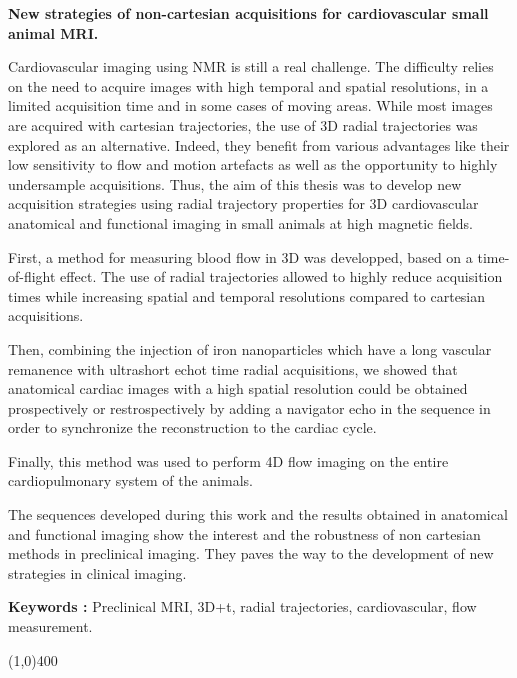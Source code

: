 \noindent
\small{\textbf{New strategies of non-cartesian acquisitions for cardiovascular small animal MRI.}

Cardiovascular imaging using NMR is still a real challenge. The difficulty relies on the need to acquire images with high temporal and spatial resolutions, in a limited acquisition time and in some cases of moving areas. While most images are acquired with cartesian trajectories, the use of 3D radial trajectories was explored as an alternative. Indeed, they benefit from various advantages like their low sensitivity to flow and motion artefacts as well as the opportunity to highly undersample acquisitions. Thus, the aim of this thesis was to develop new acquisition strategies using radial trajectory properties for 3D cardiovascular anatomical and functional imaging in small animals at high magnetic fields.

First, a method for measuring blood flow in 3D was developped, based on a time-of-flight effect. The use of radial trajectories allowed to highly reduce acquisition times while increasing spatial and temporal resolutions compared to cartesian acquisitions.

Then, combining the injection of iron nanoparticles which have a long vascular remanence with ultrashort echot time radial acquisitions, we showed that anatomical cardiac images with a high spatial resolution could be obtained prospectively or restrospectively by adding a navigator echo in the sequence in order to synchronize the reconstruction to the cardiac cycle.

Finally, this method was used to perform 4D flow imaging on the entire cardiopulmonary system of the animals.

The sequences developed during this work and the results obtained in anatomical and functional imaging show the interest and the robustness of non cartesian methods in preclinical imaging. They paves the way to the development of new strategies in clinical imaging.



\noindent
\textbf{Keywords : } Preclinical MRI, 3D+t, radial trajectories, cardiovascular, flow measurement.
}



\line(1,0){400}